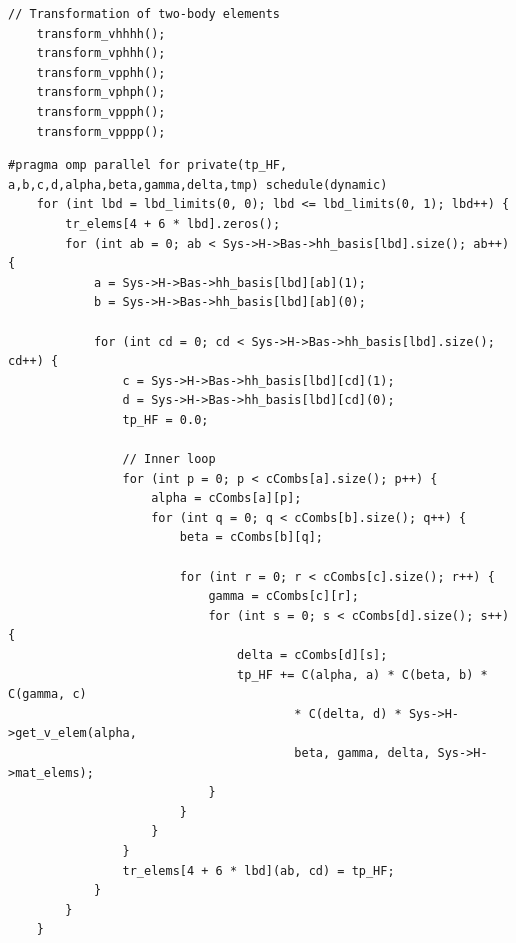 \begin{lstlisting}[float, caption={Instead of summing over all arrangements of indices as in Eq.~(\ref{eq:HFtrftb}), we make use of our two-particle basis and transform the two-body elements block-wise and according to particle and hole indices. In each of those functions,  Eq.~(\ref{eq:HFtrftb}) is implemented similar to the example of $v_{hhhh}$, which is given in listing \ref{lst:HFtrf1}.}, label={lst:HFtrf0}]
// Transformation of two-body elements
    transform_vhhhh();
    transform_vphhh();
    transform_vpphh();
    transform_vphph();
    transform_vppph();
    transform_vpppp();
\end{lstlisting}

\begin{lstlisting}[float, caption={Transformation of two-body elements of the form $v_{hhhh}$, i.e. all four indices correspond to hole states. The array \textit{tr\_elems} contains the transformed elements and is structured analogously to the array holding the matrix elements of the Hamiltonian. Array \textit{cCombs} contains those combinations $i,j$ that  correspond to non-zero elements $C_{ij}$ of the coefficient matrix. This allows us to make use of the sparsity of the $C$-matrix and perform the loops most effectively. All functions performing the basis transformation are parallelized with OpenMP.},label={lst:HFtrf1}]
#pragma omp parallel for private(tp_HF, a,b,c,d,alpha,beta,gamma,delta,tmp) schedule(dynamic)
    for (int lbd = lbd_limits(0, 0); lbd <= lbd_limits(0, 1); lbd++) {
        tr_elems[4 + 6 * lbd].zeros();
        for (int ab = 0; ab < Sys->H->Bas->hh_basis[lbd].size(); ab++) {
            a = Sys->H->Bas->hh_basis[lbd][ab](1);
            b = Sys->H->Bas->hh_basis[lbd][ab](0);

            for (int cd = 0; cd < Sys->H->Bas->hh_basis[lbd].size(); cd++) {
                c = Sys->H->Bas->hh_basis[lbd][cd](1);
                d = Sys->H->Bas->hh_basis[lbd][cd](0);
                tp_HF = 0.0;

                // Inner loop        
                for (int p = 0; p < cCombs[a].size(); p++) {
                    alpha = cCombs[a][p];
                    for (int q = 0; q < cCombs[b].size(); q++) {
                        beta = cCombs[b][q];
            
                        for (int r = 0; r < cCombs[c].size(); r++) {
                            gamma = cCombs[c][r];
                            for (int s = 0; s < cCombs[d].size(); s++) {
                                delta = cCombs[d][s];
                                tp_HF += C(alpha, a) * C(beta, b) * C(gamma, c)
                                        * C(delta, d) * Sys->H->get_v_elem(alpha, 
                                        beta, gamma, delta, Sys->H->mat_elems); 
                            }
                        }
                    }
                }
                tr_elems[4 + 6 * lbd](ab, cd) = tp_HF;
            }
        }
    }
\end{lstlisting}

